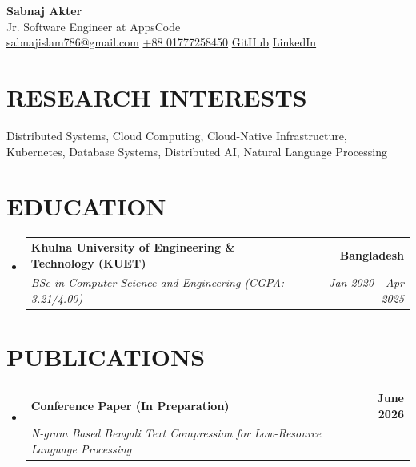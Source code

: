 \documentclass[letterpaper,11pt]{article}
\makeatletter
\newcommand{\resumeSubheading}[4]{
  \vspace{-2pt}\item
    \begin{tabular*}{1.0\textwidth}[t]{l@{\extracolsep{\fill}}r}
      \textbf{\large#1} & \textbf{\small #2} \\
      \textit{\large#3} & \textit{\small #4} \\
    \end{tabular*}\vspace{-7pt}
}
\newcommand{\resumeSubHeadingListStart}{\begin{itemize}[leftmargin=0.0in, label={}]}
\newcommand{\resumeSubHeadingListEnd}{\end{itemize}}
\makeatother
\begin{document}
\begin{flushleft}
    {\Huge \textbf{Sabnaj Akter}} \\[4pt]
    {\large Jr. Software Engineer at AppsCode} \\[6pt]

    \faEnvelope \;
    \href{mailto:sabnajislam786@gmail.com}{sabnajislam786@gmail.com}
    \quad
    \faPhone \;
    \href{tel:+8801777258450}{+88 01777258450}
    \quad
    \faGithub \;
    \href{https://github.com/sabnaj-42/}{GitHub}
    \quad
    \faLinkedin \;
    \href{https://linkedin.com/in/sabnaj-42/}{LinkedIn}
\end{flushleft}


\section{\color{black}RESEARCH INTERESTS}
\begin{itemize}[leftmargin=0in, label={}]
\small{\item{
Distributed Systems, Cloud Computing, Cloud-Native Infrastructure, Kubernetes, Database Systems,
Distributed AI, Natural Language Processing
}}
\end{itemize}
 \vspace{-10pt}

\section{\color{black}EDUCATION}
  \resumeSubHeadingListStart
    \resumeSubheading
      {Khulna University of Engineering \& Technology (KUET)}{Bangladesh}
      {BSc in Computer Science and Engineering (CGPA: 3.21/4.00)}{Jan 2020 - Apr 2025}
  \resumeSubHeadingListEnd
  \vspace{-10pt}


\section{\color{black}PUBLICATIONS}
  \resumeSubHeadingListStart
   \resumeSubheading
       {Conference Paper (In Preparation)}{June 2026}
       {N-gram Based Bengali Text Compression for Low-Resource Language Processing}{}
  \resumeSubHeadingListEnd
\vspace{-12pt}


\end{document}
